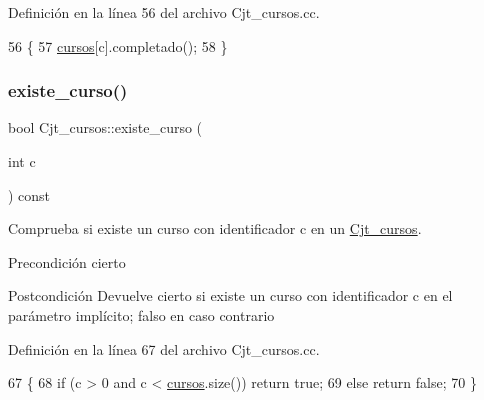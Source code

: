 Definición en la línea 56 del archivo Cjt\+\_\+cursos.\+cc.


\begin{DoxyCode}
56                                      \{
57       \mbox{\hyperlink{class_cjt__cursos_a582f9540bc295212450dba4cd18c8886}{cursos}}[c].completado();
58     \}
\end{DoxyCode}
\mbox{\label{class_cjt__cursos_aed873ef8285d1f33c391bd4d808185de}} 
\subsubsection{\texorpdfstring{existe\+\_\+curso()}{existe\_curso()}}
{\footnotesize\ttfamily bool Cjt\+\_\+cursos\+::existe\+\_\+curso (\begin{DoxyParamCaption}\item[{int}]{c }\end{DoxyParamCaption}) const}



Comprueba si existe un curso con identificador c en un \mbox{\hyperlink{class_cjt__cursos}{Cjt\+\_\+cursos}}. 

\begin{DoxyPrecond}{Precondición}
cierto 
\end{DoxyPrecond}
\begin{DoxyPostcond}{Postcondición}
Devuelve cierto si existe un curso con identificador c en el parámetro implícito; falso en caso contrario 
\end{DoxyPostcond}


Definición en la línea 67 del archivo Cjt\+\_\+cursos.\+cc.


\begin{DoxyCode}
67                                              \{
68       \textcolor{keywordflow}{if} (c > 0 and c < \mbox{\hyperlink{class_cjt__cursos_a582f9540bc295212450dba4cd18c8886}{cursos}}.size()) \textcolor{keywordflow}{return} \textcolor{keyword}{true};
69       \textcolor{keywordflow}{else} \textcolor{keywordflow}{return} \textcolor{keyword}{false};
70     \}
\end{DoxyCode}
\mbox{\label{class_cjt__cursos_a7b2a3da42d49f10bd6413fa00dbe9012}} 
